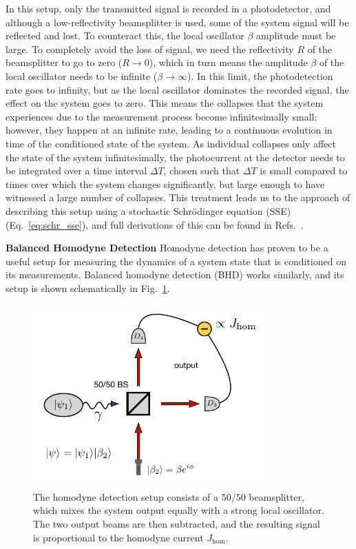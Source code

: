 In this setup, only the transmitted signal is recorded in a photodetector, and although a low-reflectivity beamsplitter is used, some of the system signal will be reflected and lost. To counteract this, the local oscillator $\beta$ amplitude must be large. To completely avoid the loss of signal, we need the reflectivity $R$ of the beamsplitter to go to zero ($R \to 0$), which in turn means the amplitude $\beta$ of the local oscillator needs to be infinite ($\beta \to \infty$). In this limit, the photodetection rate goes to infinity, but as the local oscillator dominates the recorded signal, the effect on the system goes to zero. This means the collapses that the system experiences due to the measurement process become infinitesimally small; however, they happen at an infinite rate, leading to a continuous evolution in time of the conditioned state of the system. As individual collapses only affect the state of the system infinitesimally, the photocurrent at the detector needs to be integrated over a time interval $\Delta T$, chosen such that $\Delta T$ is small compared to times over which the system changes significantly, but large enough to have witnessed a large number of collapses. This treatment leads us to the approach of describing this setup using a stochastic Schr\"{o}dinger equation (SSE) (Eq.~\ref{eq:schr_sse}), and full derivations of this can be found in Refs.~\cite{carmichael1993}.

\textbf{Balanced Homodyne Detection}
Homodyne detection has proven to be a useful setup for measuring the dynamics of a system state that is conditioned on its measurements. Balanced homodyne detection (BHD) works similarly, and its setup is shown schematically in Fig.~\ref{fig:Chapter2_Fig4}.

\begin{figure}[ht]
    \centering
    \includegraphics[width=9cm]{Chapters/Plots/Chapter3/Chapter2_Fig4.pdf}
    \caption{The homodyne detection setup consists of a $50/50$ beamsplitter, which mixes the system output equally with a strong local oscillator. The two output beams are then subtracted, and the resulting signal is proportional to the homodyne current $J_\text{hom}$.}
    \label{fig:Chapter2_Fig4}
\end{figure}

